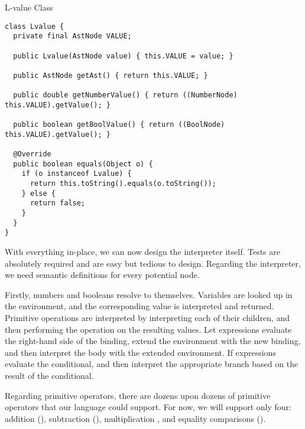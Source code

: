 \begin{cl}{L-value Class}
\begin{lstlisting}[language=MyJava]
class Lvalue {
  private final AstNode VALUE;

  public Lvalue(AstNode value) { this.VALUE = value; }

  public AstNode getAst() { return this.VALUE; }

  public double getNumberValue() { return ((NumberNode) this.VALUE).getValue(); }

  public boolean getBoolValue() { return ((BoolNode) this.VALUE).getValue(); }

  @Override
  public boolean equals(Object o) {
    if (o instanceof Lvalue) {
      return this.toString().equals(o.toString());
    } else {
      return false;
    }
  }
}
\end{lstlisting}
\end{cl}

With everything in-place, we can now design the interpreter itself. Tests are absolutely required and are easy but tedious to design. Regarding the interpreter, we need semantic definitions for every potential node. 

Firstly, numbers and booleans resolve to themselves. Variables are looked up in the environment, and the corresponding value is interpreted and returned. Primitive operations are interpreted by interpreting each of their children, and then performing the operation on the resulting values. Let expressions evaluate the right-hand side of the binding, extend the environment with the new binding, and then interpret the body with the extended environment. If expressions evaluate the conditional, and then interpret the appropriate branch based on the result of the conditional.

Regarding primitive operators, there are dozens upon dozens of primitive operators that our language could support. For now, we will support only four: addition (\ttt{+}), subtraction (\ttt{-}), multiplication \ttt{(*)}, and equality comparisons ().  

